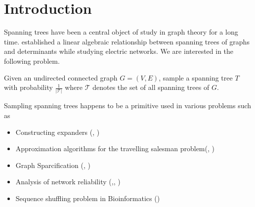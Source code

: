
\chapter{Introduction} %

\label{Chapter1} %


\newcommand{\keyword}[1]{\textbf{#1}}
\newcommand{\tabhead}[1]{\textbf{#1}}
\newcommand{\code}[1]{\texttt{#1}}
\newcommand{\file}[1]{\texttt{\bfseries#1}}
\newcommand{\option}[1]{\texttt{\itshape#1}}


Spanning trees have been a central object of study in graph theory for a long time. \citet{doi:10.1002/andp.18471481202} established a linear algebraic relationship between spanning trees of graphs and determinants while studying electric networks. We are interested in the following problem.

\begin{IP}
 Given an undirected connected graph $G = (V, E)$, sample a spanning tree $T$ with probability $\frac{1}{|\mathcal{T}|}$ where $\mathcal{T}$ denotes the set of all spanning trees of $G$. 
\end{IP}



Sampling spanning trees happens to be a primitive used in various problems such as 

\begin{itemize}
\item Constructing expanders (\cite{10.5555/1496770.1496834}, \cite{doi:10.1137/120890971})
\item Approximation algorithms for the travelling salesman problem(\cite{6108216}, \cite{doi:10.1287/opre.2017.1603})
\item Graph Sparcification (\cite{DBLP:journals/corr/abs-1005-0265}, \cite{dolev2016random})
\item Analysis of network reliability (\cite{10.5555/535891},\cite{doi:10.1002/net.3230200303}, \cite{colbourn1988estimating})
\item Sequence shuffling problem in Bioinformatics (\cite{KANDEL1996171})

\end{itemize}

